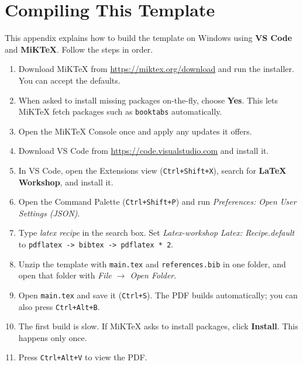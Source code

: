 \documentclass[a4paper,twoside,twocolumn]{IEEEtran}
\begin{document}






\clearpage

\appendices

\section{Compiling This Template}
\label{app:setup}
This appendix explains how to build the template on Windows using \textbf{VS
Code} and \textbf{MiKTeX}. Follow the steps in order.

\begin{enumerate}
\item Download MiKTeX from \url{https://miktex.org/download} and run the
      installer. You can accept the defaults.
\item When asked to install missing packages on-the-fly, choose \textbf{Yes}.
      This lets MiKTeX fetch packages such as \texttt{booktabs} automatically.
\item Open the MiKTeX Console once and apply any updates it offers.
\item Download VS Code from \url{https://code.visualstudio.com} and install it.
\item In VS Code, open the Extensions view (\texttt{Ctrl+Shift+X}), search for
      \textbf{LaTeX Workshop}, and install it.
\item Open the Command Palette (\texttt{Ctrl+Shift+P}) and run
      \emph{Preferences: Open User Settings (JSON)}.
\item Type \emph{latex recipe} in the search box. 
      Set \emph{Latex-workshop Latex: Recipe.default} to
      \texttt{pdflatex -> bibtex -> pdflatex * 2}.
\item Unzip the template with \texttt{main.tex} and \texttt{references.bib} in one folder, 
      and open that folder with \emph{File $\rightarrow$ Open Folder}.
\item Open \texttt{main.tex} and save it (\texttt{Ctrl+S}). The PDF builds
      automatically; you can also press \texttt{Ctrl+Alt+B}.
\item The first build is slow. If MiKTeX asks to install packages, click
      \textbf{Install}. This happens only once.
\item Press \texttt{Ctrl+Alt+V} to view the PDF.
\end{enumerate}
\end{document}

